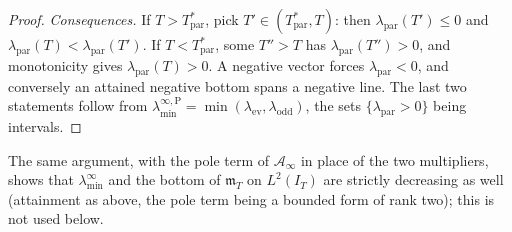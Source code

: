 \documentclass[11pt]{amsart}
\theoremstyle{definition}
\theoremstyle{remark}
\newcommand{\IT}{I_T}
\newcommand{\Ainf}{\mathcal A_\infty}
\newcommand{\mT}{\mathfrak m_T}
\newcommand{\laminf}{\lambda^{\infty}_{\min}}
\newcommand{\laminfP}{\lambda^{\infty,\mathrm P}_{\min}}
\begin{document}
\begin{proof}
\emph{Consequences.} If $T>T^*_{\mathrm{par}}$, pick $T'\in(T^*_{\mathrm{par}},T)$: then
$\lambda_{\mathrm{par}}(T')\le0$ and $\lambda_{\mathrm{par}}(T)<\lambda_{\mathrm{par}}(T')$. If
$T<T^*_{\mathrm{par}}$, some $T''>T$ has $\lambda_{\mathrm{par}}(T'')>0$, and monotonicity gives
$\lambda_{\mathrm{par}}(T)>0$. A negative vector forces $\lambda_{\mathrm{par}}<0$, and conversely an
attained negative bottom spans a negative line. The last two statements follow from
$\laminfP=\min(\lambda_{\mathrm{ev}},\lambda_{\mathrm{odd}})$, the sets $\{\lambda_{\mathrm{par}}>0\}$ being
intervals.
\end{proof}
The same argument, with the pole term of $\Ainf$ in place of the two multipliers, shows that $\laminf$
and the bottom of $\mT$ on $L^2(\IT)$ are strictly decreasing as well (attainment as above, the pole
term being a bounded form of rank two); this is not used below.
\end{document}
